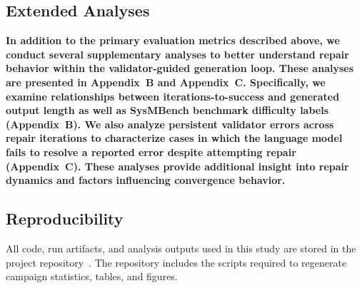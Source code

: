 \subsection{Extended Analyses}
\textbf{In addition to the primary evaluation metrics described above, we conduct several supplementary analyses to better understand repair behavior within the validator-guided generation loop. These analyses are presented in Appendix~B and Appendix~C. Specifically, we examine relationships between iterations-to-success and generated output length as well as SysMBench benchmark difficulty labels (Appendix~B). We also analyze persistent validator errors across repair iterations to characterize cases in which the language model fails to resolve a reported error despite attempting repair (Appendix~C). These analyses provide additional insight into repair dynamics and factors influencing convergence behavior.}

\subsection{Reproducibility}
All code, run artifacts, and analysis outputs used in this study are stored in the project repository~\cite{sysmbenchCompilerLoopRepo2026}. The repository includes the scripts required to regenerate campaign statistics, tables, and figures.
